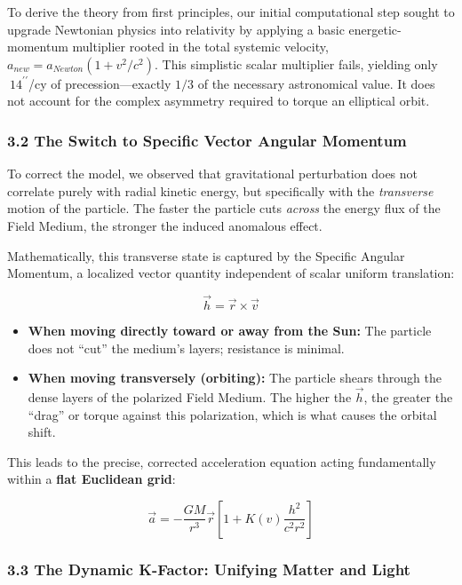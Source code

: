 \documentclass[twocolumn]{article}
\providecommand{\tightlist}{%
  \setlength{\itemsep}{0pt}\setlength{\parskip}{0pt}}
\begin{document}
To derive the theory from first principles, our initial computational
step sought to upgrade Newtonian physics into relativity by applying a
basic energetic-momentum multiplier rooted in the total systemic
velocity, \(a_{new} = a_{Newton}(1 + v^2/c^2)\). This simplistic scalar
multiplier fails, yielding only \(~14^{\prime\prime}\)/cy of
precession---exactly \(1/3\) of the necessary astronomical value. It
does not account for the complex asymmetry required to torque an
elliptical orbit.

\subsubsection{3.2 The Switch to Specific Vector Angular
Momentum}\label{the-switch-to-specific-vector-angular-momentum}

To correct the model, we observed that gravitational perturbation does
not correlate purely with radial kinetic energy, but specifically with
the \emph{transverse} motion of the particle. The faster the particle
cuts \emph{across} the energy flux of the Field Medium, the stronger the
induced anomalous effect.

Mathematically, this transverse state is captured by the Specific
Angular Momentum, a localized vector quantity independent of scalar
uniform translation:

\[ \vec{h} = \vec{r} \times \vec{v} \]

\begin{itemize}
\tightlist
\item
  \textbf{When moving directly toward or away from the Sun:} The
  particle does not ``cut'' the medium's layers; resistance is minimal.
\item
  \textbf{When moving transversely (orbiting):} The particle shears
  through the dense layers of the polarized Field Medium. The higher the
  \(\vec{h}\), the greater the ``drag'' or torque against this
  polarization, which is what causes the orbital shift.
\end{itemize}

This leads to the precise, corrected acceleration equation acting
fundamentally within a \textbf{flat Euclidean grid}:

\[ \vec{a} = -\frac{GM}{r^3}\vec{r} \left[ 1 + K(v) \frac{h^2}{c^2 r^2} \right] \]

\subsubsection{3.3 The Dynamic K-Factor: Unifying Matter and
Light}\label{the-dynamic-k-factor-unifying-matter-and-light}
\end{document}
